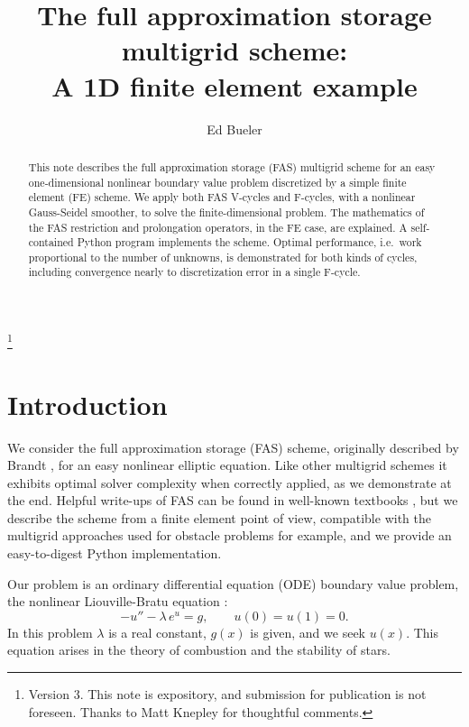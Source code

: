 \documentclass[letterpaper,final,12pt,reqno]{amsart}
\begin{document}
\title[The FAS multigrid scheme]{The full approximation storage multigrid scheme: \\ A 1D finite element example}

\author{Ed Bueler}

\begin{abstract}  This note describes the full approximation storage (FAS) multigrid scheme for an easy one-dimensional nonlinear boundary value problem discretized by a simple finite element (FE) scheme.  We apply both FAS V-cycles and F-cycles, with a nonlinear Gauss-Seidel smoother, to solve the finite-dimensional problem.  The mathematics of the FAS restriction and prolongation operators, in the FE case, are explained.  A self-contained Python program implements the scheme.  Optimal performance, i.e.~work proportional to the number of unknowns, is demonstrated for both kinds of cycles, including convergence nearly to discretization error in a single F-cycle.  \end{abstract}

\thanks{Version 3.  This note is expository, and submission for publication is not foreseen.  Thanks to Matt Knepley for thoughtful comments.}

\maketitle

\tableofcontents

\thispagestyle{empty}
\bigskip

\section{Introduction}  \label{sec:intro}

We consider the full approximation storage (FAS) scheme, originally described by Brandt \cite{Brandt1977}, for an easy nonlinear elliptic equation.  Like other multigrid schemes it exhibits optimal solver complexity \cite{Bueler2021} when correctly applied, as we demonstrate at the end.  Helpful write-ups of FAS can be found in well-known textbooks \cite{BrandtLivne2011,Briggsetal2000,Trottenbergetal2001}, but we describe the scheme from a finite element point of view, compatible with the multigrid approaches used for obstacle problems \cite{GraeserKornhuber2009} for example, and we provide an easy-to-digest Python implementation.

Our problem is an ordinary differential equation (ODE) boundary value problem, the nonlinear Liouville-Bratu equation \cite{Bratu1914,Liouville1853}:
\begin{equation}
  -u'' - \lambda\, e^u = g,  \qquad u(0) = u(1) = 0.  \label{liouvillebratu}
\end{equation}
In this problem $\lambda$ is a real constant, $g(x)$ is given, and we seek $u(x)$.  This equation arises in the theory of combustion \cite{FrankKameneckij1955} and the stability of stars.
\end{document}
